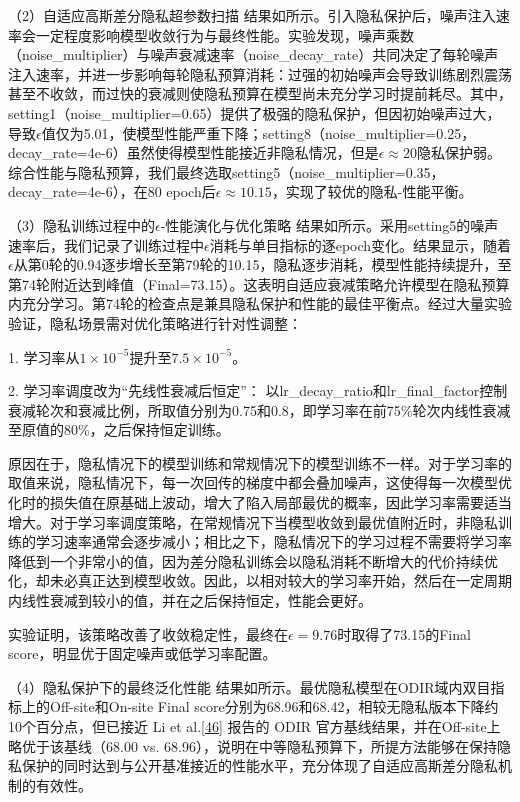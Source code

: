 （2）自适应高斯差分隐私超参数扫描 结果如所示。引入隐私保护后，噪声注入速率会一定程度影响模型收敛行为与最终性能。实验发现，噪声乘数（noise\_multiplier）与噪声衰减速率（noise\_decay\_rate）共同决定了每轮噪声注入速率，并进一步影响每轮隐私预算消耗：过强的初始噪声会导致训练剧烈震荡甚至不收敛，而过快的衰减则使隐私预算在模型尚未充分学习时提前耗尽。其中，setting1（noise\_multiplier=0.65）提供了极强的隐私保护，但因初始噪声过大，导致\(\epsilon\)值仅为5.01，使模型性能严重下降；setting8（noise\_multiplier=0.25，decay\_rate=4e-6）虽然使得模型性能接近非隐私情况，但是\(\epsilon \approx 20\)隐私保护弱。综合性能与隐私预算，我们最终选取setting5（noise\_multiplier=0.35，decay\_rate=4e-6），在80 epoch后\(\epsilon \approx 10.15\)，实现了较优的隐私-性能平衡。



（3）隐私训练过程中的\(\epsilon\)-性能演化与优化策略 结果如所示。采用setting5的噪声速率后，我们记录了训练过程中\(\epsilon\)消耗与单目指标的逐epoch变化。结果显示，随着\(\epsilon\)从第0轮的0.94逐步增长至第79轮的10.15，隐私逐步消耗，模型性能持续提升，至第74轮附近达到峰值（Final=73.15）。这表明自适应衰减策略允许模型在隐私预算内充分学习。第74轮的检查点是兼具隐私保护和性能的最佳平衡点。经过大量实验验证，隐私场景需对优化策略进行针对性调整：



1. 学习率从\(1 \times 10^{-5}\)提升至\(7.5 \times 10^{-5}\)。

2. 学习率调度改为``先线性衰减后恒定''： 以lr\_decay\_ratio和lr\_final\_factor控制衰减轮次和衰减比例，所取值分别为0.75和0.8，即学习率在前75\%轮次内线性衰减至原值的80\%，之后保持恒定训练。

原因在于，隐私情况下的模型训练和常规情况下的模型训练不一样。对于学习率的取值来说，隐私情况下，每一次回传的梯度中都会叠加噪声，这使得每一次模型优化时的损失值在原基础上波动，增大了陷入局部最优的概率，因此学习率需要适当增大。对于学习率调度策略，在常规情况下当模型收敛到最优值附近时，非隐私训练的学习速率通常会逐步减小；相比之下，隐私情况下的学习过程不需要将学习率降低到一个非常小的值，因为差分隐私训练会以隐私消耗不断增大的代价持续优化，却未必真正达到模型收敛。因此，以相对较大的学习率开始，然后在一定周期内线性衰减到较小的值，并在之后保持恒定，性能会更好。

实验证明，该策略改善了收敛稳定性，最终在\(\epsilon = 9.76\)时取得了73.15的Final score，明显优于固定噪声或低学习率配置。

（4）隐私保护下的最终泛化性能 结果如所示。最优隐私模型在ODIR域内双目指标上的Off-site和On-site Final score分别为68.96和68.42，相较无隐私版本下降约10个百分点，但已接近 Li et al.\hyperref[_Ref213949402]{{[}46{]}} 报告的 ODIR 官方基线结果，并在Off-site上略优于该基线（68.00 vs. 68.96），说明在中等隐私预算下，所提方法能够在保持隐私保护的同时达到与公开基准接近的性能水平，充分体现了自适应高斯差分隐私机制的有效性。


